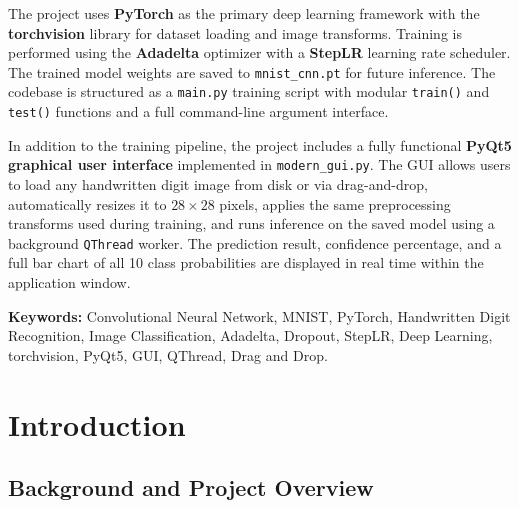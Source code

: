 \documentclass[12pt,a4paper,openany]{report}
\begin{document}
The project uses \textbf{PyTorch} as the primary deep learning framework with the \textbf{torchvision} library for dataset loading and image transforms. Training is performed using the \textbf{Adadelta} optimizer with a \textbf{StepLR} learning rate scheduler. The trained model weights are saved to \texttt{mnist\_cnn.pt} for future inference. The codebase is structured as a \texttt{main.py} training script with modular \texttt{train()} and \texttt{test()} functions and a full command-line argument interface.

In addition to the training pipeline, the project includes a fully functional \textbf{PyQt5 graphical user interface} implemented in \texttt{modern\_gui.py}. The GUI allows users to load any handwritten digit image from disk or via drag-and-drop, automatically resizes it to $28 \times 28$ pixels, applies the same preprocessing transforms used during training, and runs inference on the saved model using a background \texttt{QThread} worker. The prediction result, confidence percentage, and a full bar chart of all 10 class probabilities are displayed in real time within the application window.

\vspace{0.5cm}
\noindent\textbf{Keywords:} Convolutional Neural Network, MNIST, PyTorch, Handwritten Digit Recognition, Image Classification, Adadelta, Dropout, StepLR, Deep Learning, torchvision, PyQt5, GUI, QThread, Drag and Drop.

\newpage

\tableofcontents
\newpage

\listoffigures
{}
\newpage

\listoftables
{}
\newpage

\chapter{Introduction}

\section{Background and Project Overview}
\end{document}
